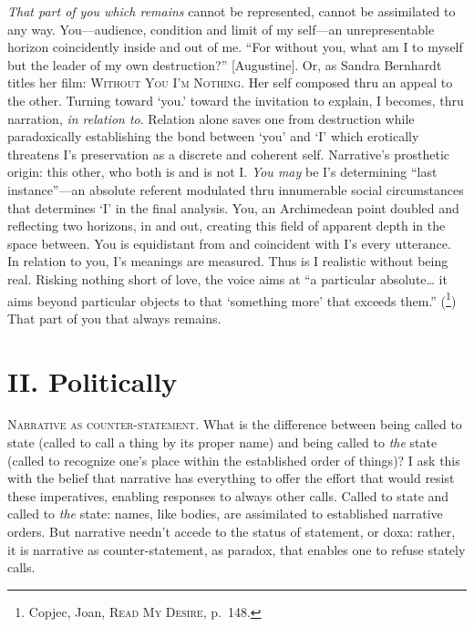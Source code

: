 \documentclass[
]{memoir}
\begin{document}
\emph{That part of you which remains} cannot be represented, cannot be
assimilated to any way. You---audience, condition and limit of my
self---an unrepresentable horizon coincidently inside and out of me.
``For without you, what am I to myself but the leader of my own
destruction?'' {[}Augustine{]}. Or, as Sandra Bernhardt titles her film:
\textsc{Without You I'm Nothing}. Her self composed thru an appeal to
the other. Turning toward `you.' toward the invitation to explain, I
becomes, thru narration, \emph{in relation to}. Relation alone saves one
from destruction while paradoxically establishing the bond between `you'
and `I' which erotically threatens I's preservation as a discrete and
coherent self. Narrative's prosthetic origin: this other, who both is
and is not I. \emph{You may} be I's determining ``last instance''---an
absolute referent modulated thru innumerable social circumstances that
determines `I' in the final analysis. You, an Archimedean point doubled
and reflecting two horizons, in and out, creating this field of apparent
depth in the space between. You is equidistant from and coincident with
I's every utterance. In relation to you, I's meanings are measured. Thus
is I realistic without being real. Risking nothing short of love, the
voice aims at ``a particular absolute\ldots{} it aims beyond particular
objects to that `something more' that exceeds them.'' (\footnote{Copjec,
  Joan, \textsc{Read My Desire}, p.~148.}) That part of you that always
remains.

\hypertarget{ii.-politically}{%
\section*{II. Politically}\label{ii.-politically}}

\textsc{Narrative as counter-statement}. What is the difference between
being called to state (called to call a thing by its proper name) and
being called to \emph{the} state (called to recognize one's place within
the established order of things)? I ask this with the belief that
narrative has everything to offer the effort that would resist these
imperatives, enabling responses to always other calls. Called to state
and called to \emph{the} state: names, like bodies, are assimilated to
established narrative orders. But narrative needn't accede to the status
of statement, or doxa: rather, it is narrative as counter-statement, as
paradox, that enables one to refuse stately calls.
\end{document}
